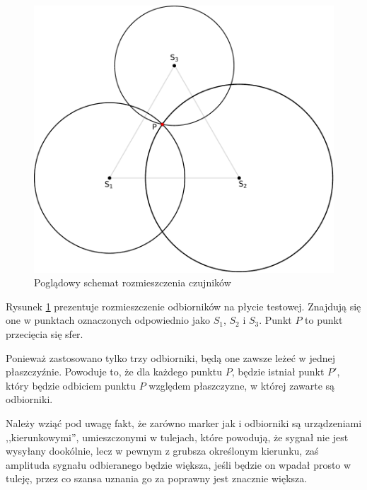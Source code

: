 \begin{figure}
  \includegraphics[width=\textwidth]{gfx/diagramy/schemat_przeciecia_sfer}
  \caption{Poglądowy schemat rozmieszczenia czujników}
  \label{fig:schema_spheres}
\end{figure}

Rysunek \ref{fig:schema_spheres} prezentuje rozmieszczenie odbiorników na płycie testowej. Znajdują się one w punktach oznaczonych odpowiednio jako $S_1$, $S_2$ i $S_3$. Punkt $P$ to punkt przecięcia się sfer.

Ponieważ zastosowano tylko trzy odbiorniki, będą one zawsze leżeć w jednej płaszczyźnie. Powoduje to, że dla każdego punktu $P$, będzie istniał punkt $P'$, który będzie odbiciem punktu $P$ względem płaszczyzne, w której zawarte są odbiorniki.

Należy wziąć pod uwagę fakt, że zarówno marker jak i odbiorniki są urządzeniami ,,kierunkowymi'', umieszczonymi w tulejach, które powodują, że sygnał nie jest wysyłany dookólnie, lecz w pewnym \ppauza z grubsza określonym \ppauza kierunku, zaś amplituda sygnału odbieranego będzie większa, jeśli będzie on wpadał prosto w tuleję, przez co szansa uznania go za poprawny jest znacznie większa.

